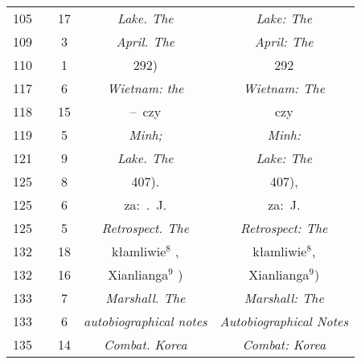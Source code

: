 \documentclass[a4paper,11pt]{article}
\begin{document}
\begin{center}
\begin{tabular}{|c|c|c|c|c|}
    105 & & 17 & \emph{Lake. The} & \emph{Lake: The} \\
    109 & &  3 & \emph{April. The} & \emph{April: The} \\
    110 & &  1 & 292) & 292 \\
    117 & &  6 & \emph{Wietnam: the} & \emph{Wietnam: The} \\
    118 & & 15 & --~czy & czy \\
    119 & &  5 & \emph{Minh;} & \emph{Minh:} \\
    121 & &  9 & \emph{Lake. The} & \emph{Lake: The} \\
    125 & &  8 & 407). & 407), \\
    125 & &  6 & za:~.~J. & za:~J. \\
    125 & &  5 & \emph{Retrospect. The} & \emph{Retrospect: The} \\
    132 & & 18 & kłamliwie$^{ 8 }$ , & kłamliwie$^{ 8 }$, \\
    132 & & 16 & Xianlianga$^{ 9 }$ ) & Xianlianga$^{ 9 }$) \\
    133 & &  7 & \emph{Marshall. The} & \emph{Marshall: The} \\
    133 & &  6 & \emph{autobiographical notes}
           & \emph{Autobiographical Notes} \\
    135 & & 14 & \emph{Combat. Korea} & \emph{Combat: Korea} \\
    \hline
  \end{tabular}




\end{center}
\end{document}
